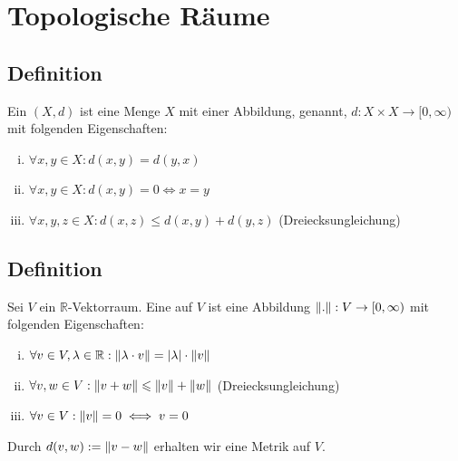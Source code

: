
\newcommand{\fach}{Grundlagen der Analysis, Topologie, Geometrie}
\newcommand{\shortFach}{Analysis, Topologie, Geometrie}
\newcommand{\semester}{SoSe 2014}
\newcommand{\homepage}{https://wwwmath.uni-muenster.de/reine/u/topos/lehre/SS2014/AnaTopGeo/anatopgeo.html}

\newcommand{\prof}{Prof.\,Dr.\,Arthur Bartels}



\maketitle
\begin{abstract}

\end{abstract}

\setcounter{page}{1}
\tableofcontents
\cleardoubleoddemptypage

\setcounter{page}{1}

\section{Topologische Räume} %
\label{sec:1}

\subsection[Definition: Metrischer Raum]{Definition} %
\label{sub:11}
Ein  $(X,d)$ ist eine Menge $X$ mit einer Abbildung,  genannt,  $d: X \times X \to [0,\infty)$ mit folgenden Eigenschaften:
\begin{enumerate}[(i)]
	\item $\forall x,y \in X : d(x,y) = d(y,x) $
	\item $\forall x,y \in X : d(x,y)=0 \iff x=y$
	\item $\forall x,y,z \in X : d(x,z) \le d(x,y) + d(y,z)$ \hfill (Dreiecksungleichung)
\end{enumerate}

\subsection[Definition: Norm auf einem $\mathds{R}$-Vektorraum]{Definition} %
\label{sub:12}
Sei $V$ ein $\mathds{R}$-Vektorraum. Eine  auf $V$ ist eine Abbildung $\norm{.} : V \to [0,\infty)$ mit folgenden Eigenschaften:
\begin{enumerate}[(i)]
	\item $\forall v \in V, \lambda  \in \mathds{R} : \norm{\lambda  \cdot v} = \abs{\lambda}  \cdot \norm{v}  $
	\item $\forall v,w \in V : \norm{v+w} \le \norm{v} + \norm{w} $ \hfill (Dreiecksungleichung)
	\item $\forall v \in V : \norm{v} = 0 \iff v=0$
\end{enumerate} 
Durch $d(v,w) := \norm{v-w} $ erhalten wir eine Metrik auf $V$.

